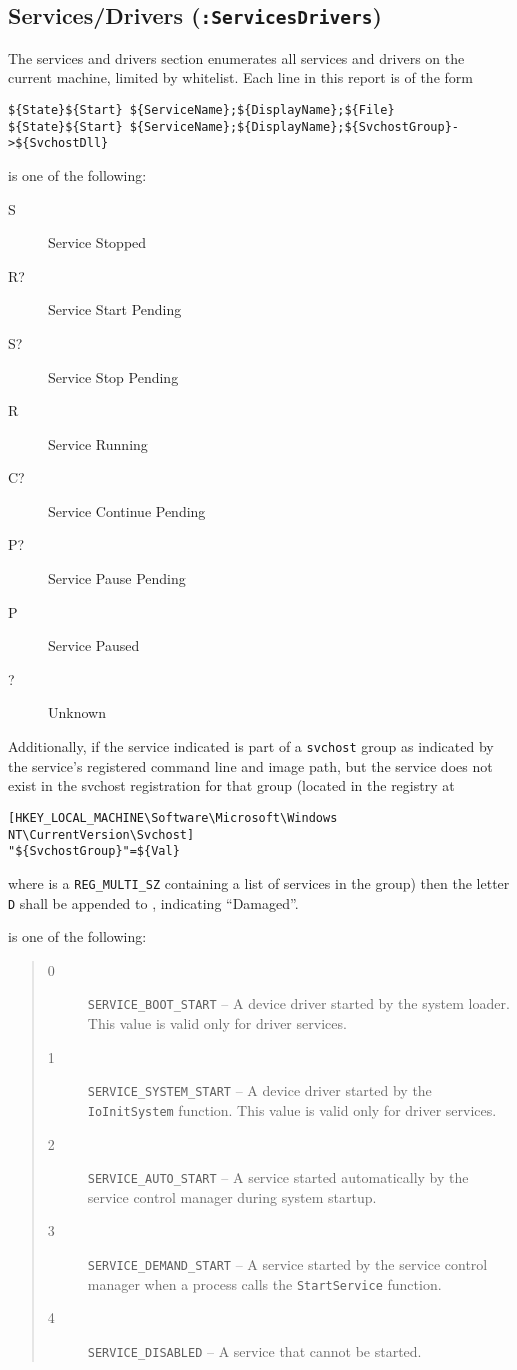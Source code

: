 \subsection{Services/Drivers (\texttt{:ServicesDrivers})}
The services and drivers section enumerates all services and drivers on the
current machine, limited by whitelist. Each line in this report is of the form
\begin{verbatim}
${State}${Start} ${ServiceName};${DisplayName};${File}
${State}${Start} ${ServiceName};${DisplayName};${SvchostGroup}->${SvchostDll}
\end{verbatim}

\noindent{} is one of the following:
\begin{description}
\item[S] Service Stopped
\item[R?] Service Start Pending
\item[S?] Service Stop Pending
\item[R] Service Running
\item[C?] Service Continue Pending
\item[P?] Service Pause Pending
\item[P] Service Paused
\item[?] Unknown
\end{description}

Additionally, if the service indicated is part of a \verb|svchost| group as
indicated by the service's registered command line and image path, but the
service does not exist in the svchost registration for that group (located in
the registry at
\begin{verbatim}
[HKEY_LOCAL_MACHINE\Software\Microsoft\Windows NT\CurrentVersion\Svchost]
"${SvchostGroup}"=${Val}
\end{verbatim}
where  is a \verb|REG_MULTI_SZ| containing a list of services in the
group) then the letter \verb|D| shall be appended to , indicating
``Damaged''.

\noindent{} is one of the following:
\begin{quote}
\begin{description}
\item[0] \verb|SERVICE_BOOT_START| -- A device driver started by the system
loader. This value is valid only for driver services.
\item[1] \verb|SERVICE_SYSTEM_START| -- A device driver started by the
\verb|IoInitSystem| function. This value is valid only for driver services.
\item[2] \verb|SERVICE_AUTO_START| -- A service started automatically by the
service control manager during system startup.
\item[3] \verb|SERVICE_DEMAND_START| -- A service started by the service control
manager when a process calls the \verb|StartService| function.
\item[4] \verb|SERVICE_DISABLED| -- A service that cannot be started.
\end{description}
\end{quote}

